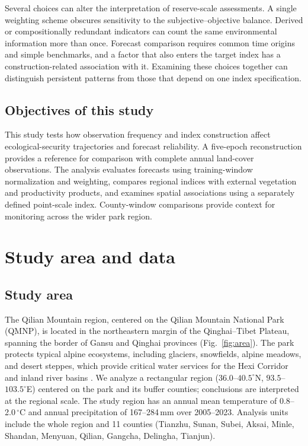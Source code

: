 \documentclass[preprint,11pt,authoryear]{elsarticle}
\begin{document}
Several choices can alter the interpretation of reserve-scale assessments. A single weighting scheme obscures sensitivity to the subjective--objective balance. Derived or compositionally redundant indicators can count the same environmental information more than once. Forecast comparison requires common time origins and simple benchmarks, and a factor that also enters the target index has a construction-related association with it. Examining these choices together can distinguish persistent patterns from those that depend on one index specification.

\subsection{Objectives of this study}
This study tests how observation frequency and index construction affect ecological-security trajectories and forecast reliability. A five-epoch reconstruction provides a reference for comparison with complete annual land-cover observations. The analysis evaluates forecasts using training-window normalization and weighting, compares regional indices with external vegetation and productivity products, and examines spatial associations using a separately defined point-scale index. County-window comparisons provide context for monitoring across the wider park region.

\section{Study area and data}
\label{sec:study}

\subsection{Study area}
The Qilian Mountain region, centered on the Qilian Mountain National Park (QMNP), is located in the northeastern margin of the Qinghai--Tibet Plateau, spanning the border of Gansu and Qinghai provinces (Fig.~\ref{fig:area}). The park protects typical alpine ecosystems, including glaciers, snowfields, alpine meadows, and desert steppes, which provide critical water services for the Hexi Corridor and inland river basins \citep{gao2023water}. We analyze a rectangular region ($36.0$--$40.5^{\circ}$N, $93.5$--$103.5^{\circ}$E) centered on the park and its buffer counties; conclusions are interpreted at the regional scale. The study region has an annual mean temperature of 0.8--2.0\,$^{\circ}$C and annual precipitation of 167--284\,mm over 2005--2023. Analysis units include the whole region and 11 counties (Tianzhu, Sunan, Subei, Aksai, Minle, Shandan, Menyuan, Qilian, Gangcha, Delingha, Tianjun).
\end{document}
